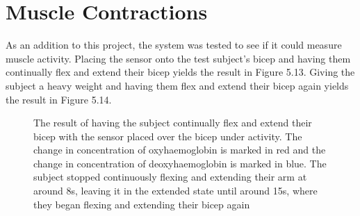 \section{Muscle Contractions}

As an addition to this project, the system was tested to see if it could measure muscle activity. Placing the sensor onto the test subject's bicep and having them continually flex and extend their bicep yields the result in Figure 5.13. Giving the subject a heavy weight and having them flex and extend their bicep again yields the result in Figure 5.14.

\begin{figure}[htp]
\centering
{}
\caption[Bicep Measurements with Continuous Flexion and Extension]{The result of having the subject continually flex and extend their bicep with the sensor placed over the bicep under activity. The change in concentration of oxyhaemoglobin is marked in red and the change in concentration of deoxyhaemoglobin is marked in blue. The subject stopped continuously flexing and extending their arm at around 8s, leaving it in the extended state until around 15s, where they began flexing and extending their bicep again}
\end{figure}


